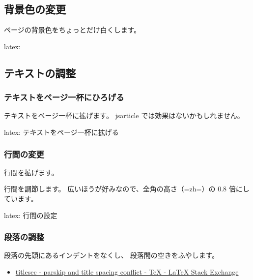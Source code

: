 \documentclass[dvipdfmx,a4j,14pt,uplatex]{jsarticle}
\begin{document}
\subsection{背景色の変更}
\label{sec:orgc89b860}
ページの背景色をちょっとだけ白くします。

\begin{programlist}[label={nil}]{latex}{: }\usepackage[pagecolor={White!95!Black}]{pagecolor}
\end{programlist}

\subsection{テキストの調整}
\label{sec:org42231d1}
\subsubsection{テキストをページ一杯にひろげる}
\label{sec:orgdab77cd}
テキストをページ一杯に拡げます。
jsarticle では効果はないかもしれません。

\begin{programlist}[label={org46e0a8e}]{latex}{: テキストをページ一杯に拡げる}\setlength{\textwidth}{\fullwidth}
\end{programlist}

\subsubsection{行間の変更}
\label{sec:orge8ec60d}
行間を拡げます。

行間を調節します。
広いほうが好みなので、全角の高さ（=zh=）の 0.8 倍にしています。

\begin{programlist}[label={orgb35ce31}]{latex}{: 行間の設定}%
\setlength{\baselineskip}{0.8 ex}
\end{programlist}

\subsubsection{段落の調整}
\label{sec:orga1e583f}
段落の先頭にあるインデントをなくし、
段落間の空きをふやします。

\begin{itemize}
\item \href{https://tex.stackexchange.com/questions/358588/parskip-and-title-spacing-conflict}{titlesec - parskip and title spacing conflict - \TeX{} - \LaTeX{} Stack Exchange}
\end{itemize}
\end{document}
